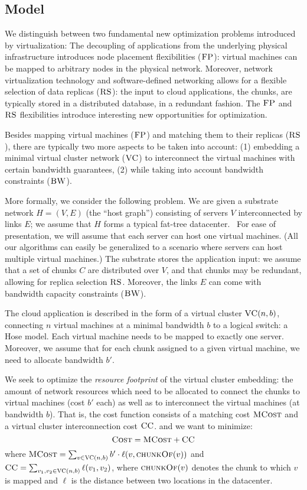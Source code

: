 \documentclass[9pt,twocolumn]{scrartcl}
\newcommand{\VC}{\textsc{VC}}
\newcommand{\CC}{\textsc{CC}}
\newcommand{\FP}{\textsc{FP}}
\newcommand{\RS}{\textsc{RS}}
\newcommand{\BW}{\textsc{BW}}
\newcommand{\Cost}{\textsc{Cost}}
\newcommand{\MatchCost}{\textsc{MCost}}
\newcommand{\chunkOf}{\textsc{chunkOf}}
\begin{document}
\subsection{Model}

We distinguish between two fundamental new optimization problems introduced by virtualization:
The decoupling of applications from the underlying physical infrastructure introduces node placement flexibilities ($\FP$):
virtual machines can be mapped to arbitrary nodes in the physical network. Moreover,
network virtualization technology and software-defined networking allows for a flexible selection of data replicas ($\RS$):
the input to cloud applications, the chunks, are typically stored in a distributed database, in a redundant fashion.
The $\FP$ and $\RS$ flexibilities introduce interesting new opportunities for optimization.

Besides mapping virtual machines ($\FP$) and matching them to their replicas ($\RS$), there are typically two more
aspects to be taken into account: (1) embedding a minimal virtual cluster network ($\VC$) to interconnect the virtual machines with certain
bandwidth guarantees, (2) while taking into account bandwidth constraints ($\BW$).

More formally, we consider the following problem. We are given a substrate network $H=(V,E)$ (the ``host graph'') consisting of servers $V$
interconnected by links $E$; we assume that $H$ forms a typical fat-tree datacenter.~\cite{todo}
For ease of presentation, we will assume that each server can host one virtual machines. (All our algorithms can easily be generalized to
a scenario where servers can host multiple virtual machines.)
The substrate stores the application input: we assume that a set of chunks $C$ are distributed over $V$, and that chunks may be redundant,
allowing for replica selection $\RS$. Moreover, the links $E$ can come with bandwidth capacity constraints ($\BW$).

The cloud application is described in the form of a virtual cluster $\VC(n,b)$, connecting $n$ virtual machines at a minimal bandwidth $b$
to a logical switch: a Hose model. Each virtual machine needs to be mapped to exactly one server. Moreover, we assume that for each chunk
assigned to a given virtual machine, we need to allocate bandwidth $b'$.

We seek to optimize the \emph{resource footprint} of the virtual cluster embedding: the amount of network resources which need to be allocated
to connect the chunks to virtual machines (cost $b'$ each) as well as to interconnect the virtual machines (at bandwidth $b$). That is,
the cost function consists of a matching cost $\MatchCost$ and a virtual cluster interconnection cost $\CC$.
and we want to minimize:
$$
\Cost = \MatchCost + \CC
$$
\noindent where $\MatchCost = \sum_{v\in \VC(n,b)} b'\cdot \ell(v,\chunkOf(v))$ and
$\CC = \sum_{v_1,v_2\in \VC(n,b)} \ell(v_1,v_2)$, where $\chunkOf(v)$ denotes
the chunk to which $v$ is mapped and $\ell$ is the distance
between two locations in the datacenter.
\end{document}
